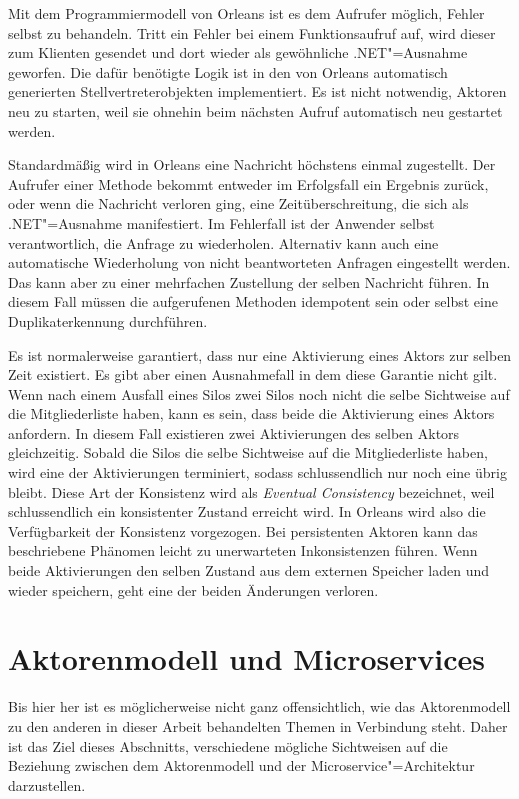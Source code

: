 Mit dem Programmiermodell von Orleans ist es dem Aufrufer möglich, Fehler selbst zu behandeln. Tritt ein Fehler bei einem Funktionsaufruf auf, wird dieser zum Klienten gesendet und dort wieder als gewöhnliche .NET"=Ausnahme geworfen. Die dafür benötigte Logik ist in den von Orleans automatisch generierten Stellvertreterobjekten implementiert. Es ist nicht notwendig, Aktoren neu zu starten, weil sie ohnehin beim nächsten Aufruf automatisch neu gestartet werden.

Standardmäßig wird in Orleans eine Nachricht höchstens einmal zugestellt. Der Aufrufer einer Methode bekommt entweder im Erfolgsfall ein Ergebnis zurück, oder wenn die Nachricht verloren ging, eine Zeitüberschreitung, die sich als .NET"=Ausnahme manifestiert. Im Fehlerfall ist der Anwender selbst verantwortlich, die Anfrage zu wiederholen. Alternativ kann auch eine automatische Wiederholung von nicht beantworteten Anfragen eingestellt werden. Das kann aber zu einer mehrfachen Zustellung der selben Nachricht führen. In diesem Fall müssen die aufgerufenen Methoden idempotent sein oder selbst eine Duplikaterkennung durchführen.

Es ist normalerweise garantiert, dass nur eine Aktivierung eines Aktors zur selben Zeit existiert. Es gibt aber einen Ausnahmefall in dem diese Garantie nicht gilt. Wenn nach einem Ausfall eines Silos zwei Silos noch nicht die selbe Sichtweise auf die Mitgliederliste haben, kann es sein, dass beide die Aktivierung eines Aktors anfordern. In diesem Fall existieren zwei Aktivierungen des selben Aktors gleichzeitig. Sobald die Silos die selbe Sichtweise auf die Mitgliederliste haben, wird eine der Aktivierungen terminiert, sodass schlussendlich nur noch eine übrig bleibt. Diese Art der Konsistenz wird als \textit{Eventual Consistency} bezeichnet, weil schlussendlich ein konsistenter Zustand erreicht wird. In Orleans wird also die Verfügbarkeit der Konsistenz vorgezogen. Bei persistenten Aktoren kann das beschriebene Phänomen leicht zu unerwarteten Inkonsistenzen führen. Wenn beide Aktivierungen den selben Zustand aus dem externen Speicher laden und wieder speichern, geht eine der beiden Änderungen verloren.

\section{Aktorenmodell und Microservices}

Bis hier her ist es möglicherweise nicht ganz offensichtlich, wie das Aktorenmodell zu den anderen in dieser Arbeit behandelten Themen in Verbindung steht. Daher ist das Ziel dieses Abschnitts, verschiedene mögliche Sichtweisen auf die Beziehung zwischen dem Aktorenmodell und der Microservice"=Architektur darzustellen.

